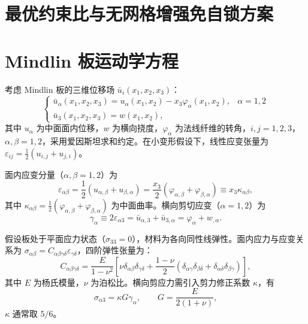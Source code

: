 \documentclass[internationalmaster]{hquThesis}
\begin{document}

\section{最优约束比与无网格增强免自锁方案}



\section{Mindlin 板运动学方程}

考虑 Mindlin 板的三维位移场 $\bar{u}_i(x_1,x_2,x_3)$：
\begin{equation}
\begin{cases}
\bar{u}_\alpha(x_1,x_2,x_3) = u_\alpha(x_1,x_2) - x_3\varphi_\alpha(x_1,x_2), & \alpha = 1,2 \\
\bar{u}_3(x_1,x_2,x_3) = w(x_1,x_2),
\end{cases}
\end{equation}
其中 $u_\alpha$ 为中面面内位移，$w$ 为横向挠度，$\varphi_\alpha$ 为法线纤维的转角，$i,j=1,2,3$，$\alpha,\beta=1,2$，采用爱因斯坦求和约定。在小变形假设下，线性应变张量为 $\varepsilon_{ij} = \frac{1}{2}(u_{i,j}+u_{j,i})$。

面内应变分量（$\alpha,\beta=1,2$）为
\begin{equation}
\varepsilon_{\alpha\beta} = \frac{1}{2}(u_{\alpha,\beta}+u_{\beta,\alpha})
= \frac{x_3}{2}(\varphi_{\alpha,\beta}+\varphi_{\beta,\alpha})
\equiv x_3 \kappa_{\alpha\beta},
\end{equation}
其中 $\kappa_{\alpha\beta} = \frac{1}{2}(\varphi_{\alpha,\beta}+\varphi_{\beta,\alpha})$ 为中面曲率。横向剪切应变（$\alpha=1,2$）为
\begin{equation}
\gamma_\alpha \equiv 2\varepsilon_{\alpha 3} = \bar{u}_{\alpha,3}+\bar{u}_{3,\alpha}
= \varphi_\alpha + w_{,\alpha}.
\end{equation}

假设板处于平面应力状态（$\sigma_{33}=0$），材料为各向同性线弹性。面内应力与应变关系为 $\sigma_{\alpha\beta}=C_{\alpha\beta\gamma\delta}\varepsilon_{\gamma\delta}$，四阶弹性张量为：
\begin{equation}
C_{\alpha\beta\gamma\delta} = \frac{E}{1-\nu^2}\left[\nu\delta_{\alpha\beta}\delta_{\gamma\delta} + \frac{1-\nu}{2}(\delta_{\alpha\gamma}\delta_{\beta\delta}+\delta_{\alpha\delta}\delta_{\beta\gamma})\right],
\end{equation}
其中 $E$ 为杨氏模量，$\nu$ 为泊松比。横向剪应力需引入剪力修正系数 $\kappa$，有
\begin{equation}
\sigma_{\alpha 3} = \kappa G \gamma_\alpha, \qquad G = \frac{E}{2(1+\nu)},
\end{equation}
$\kappa$ 通常取 $5/6$。
\end{document}
